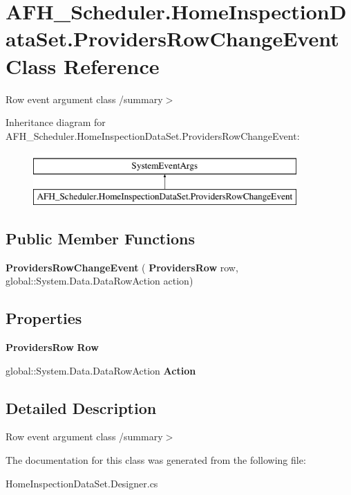 \section{A\+F\+H\+\_\+\+Scheduler.\+Home\+Inspection\+Data\+Set.\+Providers\+Row\+Change\+Event Class Reference}
\label{class_a_f_h___scheduler_1_1_home_inspection_data_set_1_1_providers_row_change_event}


Row event argument class /summary$>$  


Inheritance diagram for A\+F\+H\+\_\+\+Scheduler.\+Home\+Inspection\+Data\+Set.\+Providers\+Row\+Change\+Event\+:\begin{figure}[H]
\begin{center}
\leavevmode
\includegraphics[height=2.000000cm]{class_a_f_h___scheduler_1_1_home_inspection_data_set_1_1_providers_row_change_event}
\end{center}
\end{figure}
\subsection*{Public Member Functions}
\begin{DoxyCompactItemize}
\item 
\mbox{\label{class_a_f_h___scheduler_1_1_home_inspection_data_set_1_1_providers_row_change_event_a6e09e1f56b1acccbfe36e99f034c39fa}} 
{\bfseries Providers\+Row\+Change\+Event} (\textbf{ Providers\+Row} row, global\+::\+System.\+Data.\+Data\+Row\+Action action)
\end{DoxyCompactItemize}
\subsection*{Properties}
\begin{DoxyCompactItemize}
\item 
\mbox{\label{class_a_f_h___scheduler_1_1_home_inspection_data_set_1_1_providers_row_change_event_a525473a69652d2c78c48ec2b4ce54b0d}} 
\textbf{ Providers\+Row} {\bfseries Row}\hspace{0.3cm}{\ttfamily  [get]}
\item 
\mbox{\label{class_a_f_h___scheduler_1_1_home_inspection_data_set_1_1_providers_row_change_event_a5b7f6f675f2bdf5712bd964a687fb0e3}} 
global\+::\+System.\+Data.\+Data\+Row\+Action {\bfseries Action}\hspace{0.3cm}{\ttfamily  [get]}
\end{DoxyCompactItemize}


\subsection{Detailed Description}
Row event argument class /summary$>$ 

The documentation for this class was generated from the following file\+:\begin{DoxyCompactItemize}
\item 
Home\+Inspection\+Data\+Set.\+Designer.\+cs\end{DoxyCompactItemize}
